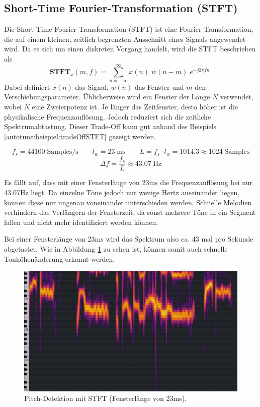 \subsection{Short-Time Fourier-Transformation (STFT)
\label{autotune:subsection:shortTimeFourierTransformation}}
Die Short-Time Fourier-Transformation (STFT) ist eine Fourier-Transformation, die auf einem kleinen,
zeitlich begrenzten Ausschnitt eines Signals angewendet wird.
Da es sich um einen diskreten Vorgang handelt, wird die STFT beschrieben als
\begin{equation}
    \mathbf{STFT}_x(m, f)
    =
    \sum_{n=-\infty}^{\infty}x(n)\;w(n-m)\;e^{-j 2 \pi f n}.
\end{equation}
Dabei definiert $x(n)$ das Signal, $w(n)$ das Fenster und $m$ den Verschiebungsparameter.
Üblicherweise wird ein Fenster der Länge $N$ verwendet, wobei $N$ eine Zweierpotenz ist.
Je länger das Zeitfenster, desto höher ist die physikalische Frequenzauflösung. Jedoch reduziert sich die zeitliche Spektrumabtastung.
Dieser Trade-Off kann gut anhand des Beispiels \ref{autotune:beispiel:tradeOffSTFT} gezeigt werden.
\begin{beispiel} 
    \[
        f_s = 44100\;\text{Samples/s} \quad\quad l_w = 23\;\text{ms} \quad\quad L = f_s \cdot l_w = 1014.3 \approx 1024\;\text{Samples}
    \]
    \[
        \Delta f = \frac{f_s}{L}\approx 43.07\;\text{Hz}
    \]
    \label{autotune:beispiel:tradeOffSTFT}
\end{beispiel}
Es fällt auf, dass mit einer Fensterlänge von 23\;ms die Frequenzauflösung bei nur 43.07\;Hz liegt.
Da einzelne Töne jedoch nur wenige Hertz auseinander liegen, können diese nur ungenau voneinander unterschieden werden.
Schnelle Melodien verhindern das Verlängern der Fensterzeit, da sonst mehrere Töne in ein Segment fallen und nicht mehr identifiziert werden können.

Bei einer Fensterlänge von 23\;ms wird das Spektrum also ca. 43 mal pro Sekunde abgetastet.
Wie in Abbildung \ref{autotune:fig:pitchDetektionSTFT} zu sehen ist, können somit auch schnelle Tonhöhenänderung erkannt werden.
\begin{figure}
	\centering
	\includegraphics[width=\textwidth]{papers/autotune/images/Pianoscale_Example_Detuned_STFT.png}
	\caption{Pitch-Detektion mit STFT (Fensterlänge von 23\;ms).}
    \label{autotune:fig:pitchDetektionSTFT}
\end{figure}

